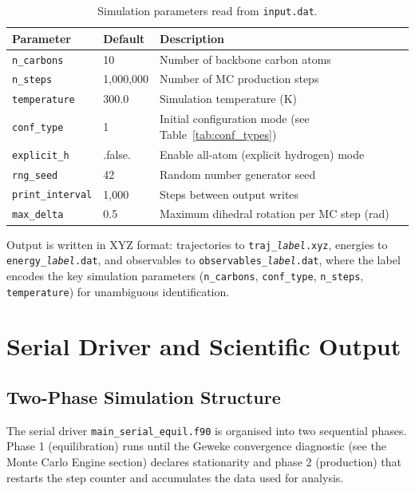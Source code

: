 \documentclass[11pt, a4paper]{article}
\begin{document}
\begin{table}[ht]
\centering
\caption{Simulation parameters read from \texttt{input.dat}.}
\label{tab:input_params}
\begin{tabular}{lll}
\toprule
Parameter & Default & Description \\
\midrule
\texttt{n\_carbons}   & 10       & Number of backbone carbon atoms \\
\texttt{n\_steps}     & 1{,}000{,}000 & Number of MC production steps \\
\texttt{temperature}  & 300.0    & Simulation temperature (K) \\
\texttt{conf\_type}   & 1        & Initial configuration mode (see Table~\ref{tab:conf_types}) \\
\texttt{explicit\_h}  & .false.  & Enable all-atom (explicit hydrogen) mode \\
\texttt{rng\_seed}    & 42       & Random number generator seed \\
\texttt{print\_interval} & 1{,}000 & Steps between output writes \\
\texttt{max\_delta}   & 0.5      & Maximum dihedral rotation per MC step (rad) \\
\midrule
\end{tabular}
\end{table}

Output is written in XYZ format: trajectories to
\texttt{traj\_\textit{label}.xyz}, energies to
\texttt{energy\_\textit{label}.dat}, and observables to
\texttt{observables\_\textit{label}.dat}, where the label encodes the key
simulation parameters (\texttt{n\_carbons}, \texttt{conf\_type},
\texttt{n\_steps}, \texttt{temperature}) for unambiguous identification.

\section{Serial Driver and Scientific Output}
\label{sec:serial_driver}

\subsection{Two-Phase Simulation Structure}

The serial driver \texttt{main\_serial\_equil.f90} is organised into two
sequential phases. Phase 1 (equilibration) runs until the Geweke convergence
diagnostic (see the Monte Carlo Engine section) declares stationarity and phase 2
(production) that restarts the step counter and accumulates the data used for
analysis. 
\end{document}
